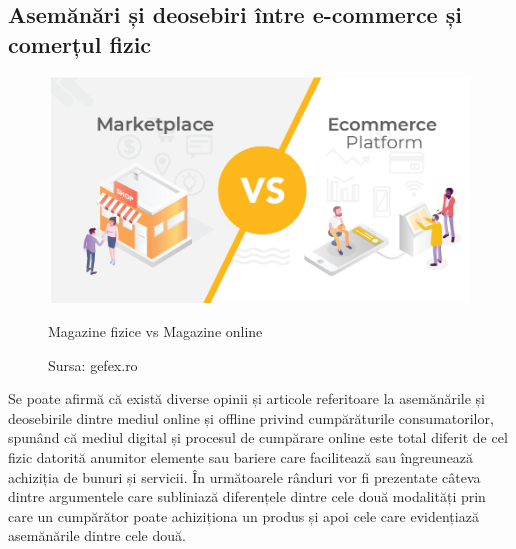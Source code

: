 \documentclass[a4paper, 12pt]{article}
\begin{document}
	\subsection{Asemănări și deosebiri între e-commerce și comerțul fizic}
	\begin{figure}[!htb]
		\centering
		\includegraphics[width=13cm, height=6cm]{"figures/magazin.png"}
		\caption{Magazine fizice vs Magazine online}
		\caption*{ Sursa: gefex.ro}
	\end{figure}
	
	\quad Se poate afirmă că există diverse opinii și articole referitoare la asemănările și deosebirile dintre mediul online și offline privind cumpărăturile consumatorilor, spunând că mediul digital și procesul de cumpărare online este total diferit de cel fizic datorită anumitor elemente sau bariere care facilitează sau îngreunează achiziția de bunuri și servicii. În următoarele rânduri vor fi prezentate câteva dintre argumentele care subliniază diferențele dintre cele două modalități prin care un cumpărător poate achiziționa un produs și apoi cele care evidențiază asemănările dintre cele două.
	\bigskip
	
\end{document}
